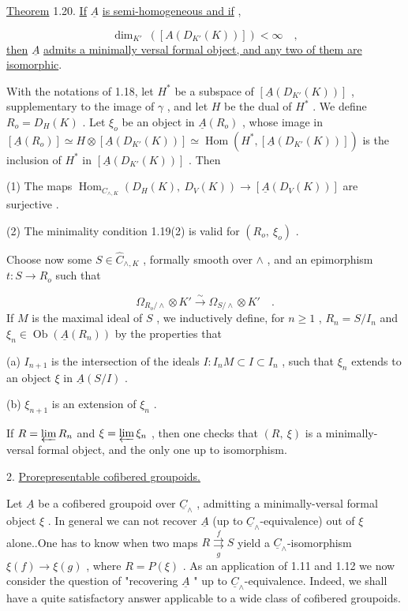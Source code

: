 \underline{Theorem} 1.20.   \underline{If}  $\underline{A}$  \underline{is semi-homogeneous and if}  ,

\begin{equation*}
\dim_{K'}\ ([A(D_{K'}(K))]) < \infty \quad ,
\end{equation*}
\underline{then}  $\underline{A}$  \underline{admits a minimally versal formal object, and any two of them are}
\underline{isomorphic}.

With the notations of 1.18, let  $H^*$  be a subspace of  $[\underline{A}(D_{K'}(K))]$ , supplementary to the image of  $\gamma$ , and let  $H$  be the dual of  $H^*$ . We define $R_o = D_H(K)$ . Let  $\xi_o$  be an object in  $\underline{A}(R_o)$ , whose image in $[\underline{A}(R_o)] \simeq H \otimes [\underline{A}(D_{K'}(K))] \simeq \operatorname{Hom}(H^*,[\underline{A}(D_{K'}(K))])$  is the inclusion of  $H^*$  in $[\underline{A}(D_{K'}(K))]$ . Then

(1)  The maps  $\operatorname{Hom}_{C_{\wedge,K}}(D_H(K),\ D_V(K)) \longrightarrow [\underline{A}(D_V(K))]$  are surjective .

(2)  The minimality condition 1.19(2)  is valid for  $(R_o,\ \xi_o)$  .

Choose now some  $S \in \hat{C}_{\wedge,K}$ , formally smooth over  $\wedge$ , and an epimorphism $t : S \longrightarrow R_o$  such that

\begin{equation*}
\Omega_{R_o/\wedge} \otimes K' \overset{\sim}{\longrightarrow} \Omega_{S/\wedge} \otimes K' \quad .
\end{equation*}
If  $M$  is the maximal ideal of  $S$ , we inductively define, for  $n \geq 1$ , $R_n = S/I_n$  and  $\xi_n \in \operatorname{Ob}(\underline{A}(R_n))$  by the properties that

(a)  $I_{n+1}$  is the intersection of the ideals  $I : I_n M \subset I \subset I_n$ , such that  $\xi_n$ extends to an object  $\xi$  in  $\underline{A}(S/I)$  .

(b)  $\xi_{n+1}$  is an extension of  $\xi_n$  .

If  $R = \varprojlim R_n$  and  $\xi = \varprojlim \xi_n$ , then one checks that  $(R,\ \xi)$  is a minimally-versal formal object, and the only one up to isomorphism.


2. \underline{Prorepresentable cofibered groupoids.}

Let  $\underline{A}$  be a cofibered groupoid over  $\underline{C}_\wedge$ , admitting a minimally-versal formal object  $\xi$ . In general we can not recover  $\underline{A}$  (up to  $\underline{C}_\wedge$-equivalence) out of  $\xi$  alone..One has to know when two maps  $R \overset{f}{\underset{g}{\rightrightarrows}} S$  yield a  $\underline{C}_\wedge$-isomorphism $\xi(f) \longrightarrow \xi(g)$ , where  $R = P(\xi)$ . As an application of 1.11  and 1.12 we now consider the question of  "recovering  $\underline{A}$ "  up to  $\underline{C}_\wedge$-equivalence. Indeed, we
shall have a quite satisfactory answer applicable to a wide class of cofibered groupoids.

